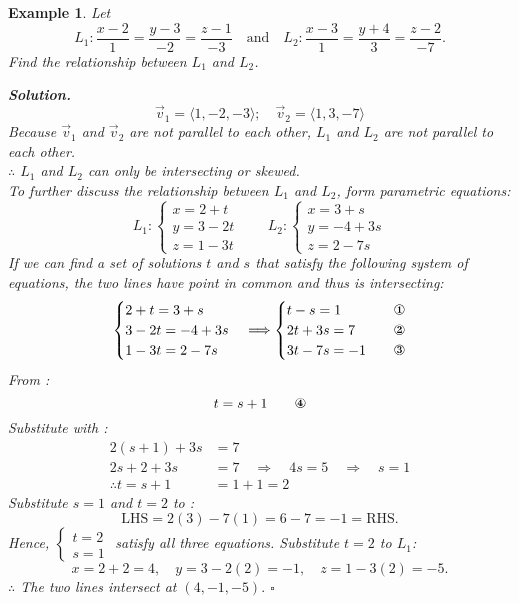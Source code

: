 \documentclass[12pt,a4paper]{article}
\newtheorem{eg}{Example}[subsection]
\newenvironment*{sol}{\par\indent\textbf{Solution. }}{\hfill{$\square$}\par}
\def\vecv{\vec{v}}
\begin{document}
\begin{eg}
	Let \[L_1: \frac{x-2}{1}=\frac{y-3}{-2}=\frac{z-1}{-3}\quad\text{and}\quad L_2: \frac{x-3}{1}=\frac{y+4}{3}=\frac{z-2}{-7}.\] Find the relationship between $L_1$ and $L_2$.
	\begin{sol}
		\[\vecv_1=\langle1,-2,-3\rangle;\quad\vecv_2=\langle1,3,-7\rangle\]	 Because $\vecv_1$ and $\vecv_2$ are not parallel to each other, $L_1$ and $L_2$ are not parallel to each other. \\
		$\therefore$ $L_1$ and $L_2$ can only be intersecting or skewed. \\ 
		To further discuss the relationship between $L_1$ and $L_2$, form parametric equations: 
		\[L_1: \begin{cases}x=2+t\\y=3-2t\\z=1-3t\end{cases}\qquad L_2: \begin{cases}x=3+s\\y=-4+3s\\z=2-7s\end{cases}\]
		If we can find a set of solutions $t$ and $s$ that satisfy the following system of equations, the two lines have point in common and thus is intersecting: \[\begin{cases}2+t=3+s\\3-2t=-4+3s\\1-3t=2-7s\end{cases}\Longrightarrow\begin{cases}t-s=1\quad&\text{\ding{172}}\\2t+3s=7\quad&\text{\ding{173}}\\3t-7s=-1\quad&\text{\ding{174}}\end{cases}\]
		From : \[t=s+1\qquad\text{\ding{175}}\]
		Substitute  with : $$\begin{aligned}
			2(s+1)+3s&=7\\
			2s+2+3s&=7\quad\Rightarrow\quad4s=5\quad\Rightarrow\quad s=1\\
			\therefore t=s+1&=1+1=2
		\end{aligned}$$
		Substitute $s=1$ and $t=2$ to : \[\text{LHS}=2(3)-7(1)=6-7=-1=\text{RHS}.\]
		Hence, $\begin{cases}t=2\\s=1\end{cases}$ satisfy all three equations. Substitute $t=2$ to $L_1$: \[x=2+2=4,\quad y=3-2(2)=-1,\quad z=1-3(2)=-5.\]
		$\therefore$ The two lines intersect at $(4,-1,-5).$
	\end{sol}
\end{eg}
\end{document}
